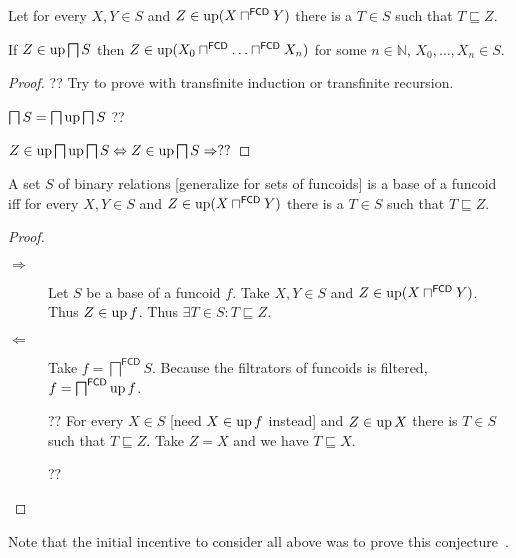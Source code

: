 \begin{lem}
  Let for every $X, Y \in S$ and $Z \in \operatorname{up} (X
  \sqcap^{\mathsf{FCD}} Y)$ there is a $T \in S$ such that $T
  \sqsubseteq Z$.
  
  If $Z \in \operatorname{up} \bigsqcap S$ then $Z \in \operatorname{up} (X_0
  \sqcap^{\mathsf{FCD}} \ldots \sqcap^{\mathsf{FCD}} X_n)$ for
  some $n \in \mathbb{N}$, $X_0, \ldots, X_n \in S$.
\end{lem}

\begin{proof}
  ?? Try to prove with transfinite induction or transfinite recursion.

  $\bigsqcap S = \bigsqcap \operatorname{up} \bigsqcap S$ ??
  
  $Z \in \operatorname{up} \bigsqcap \operatorname{up} \bigsqcap S \Leftrightarrow Z \in
  \operatorname{up} \bigsqcap S \Rightarrow ? ?$
\end{proof}

\begin{prop}
  A set $S$ of binary relations [generalize for sets of funcoids] is a base of
  a funcoid iff for every $X, Y \in S$ and $Z \in \operatorname{up} (X
  \sqcap^{\mathsf{FCD}} Y)$ there is a $T \in S$ such that $T
  \sqsubseteq Z$.
\end{prop}

\begin{proof}
  ~
  \begin{description}
    \item[$\Rightarrow$] Let $S$ be a base of a funcoid $f$. Take $X, Y \in S$
    and $Z \in \operatorname{up} (X \sqcap^{\mathsf{FCD}} Y)$. Thus $Z \in
    \operatorname{up} f$. Thus $\exists T \in S : T \sqsubseteq Z$.
    
    \item[$\Leftarrow$] Take $f = \bigsqcap^{\mathsf{FCD}} S$. Because
    the filtrators of funcoids is filtered, $f =
    \bigsqcap^{\mathsf{FCD}} \operatorname{up} f$.
    
    ?? For every $X \in S$ [need $X \in \operatorname{up} f$ instead] and $Z \in
    \operatorname{up} X$ there is $T \in S$ such that $T \sqsubseteq Z$. Take $Z = X$
    and we have $T \sqsubseteq X$.
    
    ??
  \end{description}
\end{proof}


Note that the initial incentive to consider all above was to prove this conjecture~.